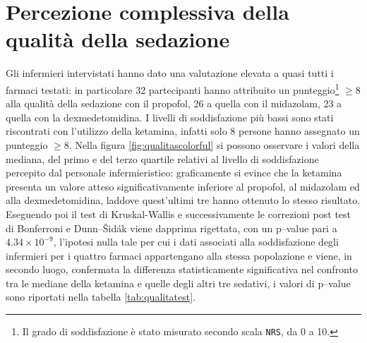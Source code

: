 \section{Percezione complessiva della qualità della sedazione}
Gli infermieri intervistati hanno dato una valutazione elevata a quasi tutti i farmaci testati: in particolare 32 partecipanti hanno attribuito un punteggio\footnote{Il grado di soddisfazione è stato misurato secondo scala \texttt{NRS}, da 0 a 10.} $\geq8$ alla qualità della sedazione con il propofol, 26 a quella con il midazolam, 23 a quella con la dexmedetomidina. I livelli di soddisfazione più bassi sono stati riscontrati con l'utilizzo della ketamina, infatti solo 8 persone hanno assegnato un punteggio $\geq8$. Nella figura \ref{fig:qualitascolorful} si possono osservare i valori della mediana, del primo e del terzo quartile relativi al livello di soddisfazione percepito dal personale infermieristico: graficamente si evince che la ketamina presenta un valore atteso significativamente inferiore al propofol, al midazolam ed alla dexmedetomidina, laddove quest'ultimi tre hanno ottenuto lo stesso risultato. Eseguendo poi il test di Kruskal-Wallis e successivamente le correzioni post test di Bonferroni e Dunn--Šidák viene dapprima rigettata, con un p--value pari a $4.34\times10^{-9}$, l'ipotesi nulla tale per cui i dati associati alla soddisfazione degli infermieri per i quattro farmaci appartengano alla stessa popolazione e viene, in secondo luogo, confermata la differenza statisticamente significativa nel confronto tra le mediane della ketamina e quelle degli altri tre sedativi, i valori di p--value sono riportati nella tabella \ref{tab:qualitatest}. 


\vfill


